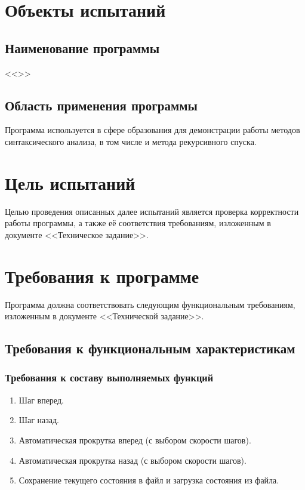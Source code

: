 \documentclass[a4paper,12pt]{article}
\begin{document}
  \CRTpreamble

  \section{Объекты испытаний}
  \subsection{Наименование программы}
  <<\CRTname>>

  \subsection{Область применения программы}
  Программа используется в сфере образования для демонстрации работы
  методов синтаксического анализа, в том числе и метода рекурсивного спуска.

  \newpage
  \section{Цель испытаний}
  Целью проведения описанных далее испытаний является проверка корректности работы программы,
  а также её соответствия требованиям, изложенным в документе <<Техническое задание>>.

  \newpage
  \section{Требования к программе}
  Программа должна соответствовать следующим функциональным требованиям, изложенным в документе <<Технической задание>>.
  \subsection{Требования к функциональным характеристикам}
  \subsubsection{Требования к составу выполняемых функций}
  \label{sec:funcs}
  \begin{enumerate}
    \item Шаг вперед.
    \item Шаг назад.
    \item Автоматическая прокрутка вперед (с выбором скорости шагов).
    \item Автоматическая прокрутка назад (с выбором скорости шагов).
    \item Сохранение текущего состояния в файл и загрузка состояния из файла.
  \end{enumerate}
\end{document}
